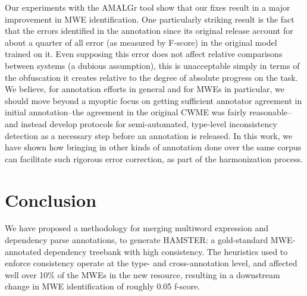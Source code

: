 \documentclass[output=paper
,modfonts
,nonflat]{langsci/langscibook}
\begin{document}
Our experiments with the AMALGr tool show that our fixes result in a major improvement in MWE identification. One particularly striking result is the fact that the errors identified in the annotation since its original release account for about a quarter of all error (as measured by F-score) in the original model trained on it. Even supposing this error does not affect relative comparisons between systems (a dubious assumption), this is unacceptable simply in terms of the obfuscation it creates relative to the degree of absolute progress on the task. We believe, for annotation efforts in general and for MWEs in particular, we should move beyond a myoptic focus on getting sufficient annotator agreement in initial annotation--the agreement in the original CWME was fairly reasonable--and instead develop protocols for semi-automated, type-level inconsistency detection as a necessary step before an annotation is released. In this work, we have shown how bringing in other kinds of annotation done over the same corpus can facilitate such rigorous error correction, as part of the harmonization process.


\section{Conclusion}

We have proposed a methodology for merging multiword expression and dependency parse annotations, to generate HAMSTER: a gold-standard MWE-annotated dependency treebank with high consistency. The heuristics used to enforce consistency operate at the type- and cross-annotation level, and affected well over 10\% of the MWEs in the new resource, resulting in a downstream change in MWE identification of roughly 0.05 f-score.

%
%

{\sloppy
\printbibliography[heading=subbibliography,notkeyword=this]
}
\end{document}

